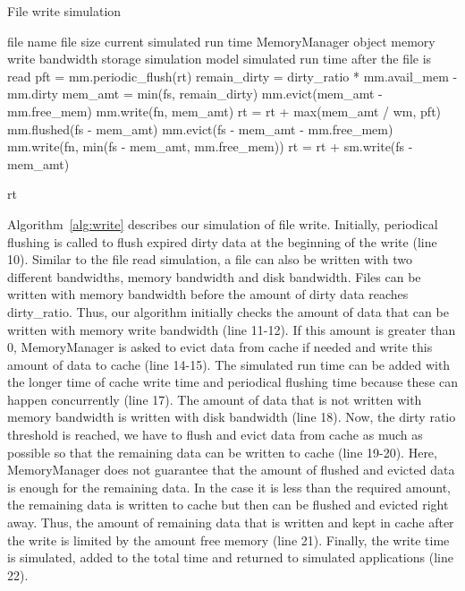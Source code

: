 \documentclass[conference]{IEEEtran}
\newcommand{\Desc}[2]{\State \makebox[2em][l]{#1}#2}
\begin{document}
			\begin{algorithm}\caption{File write simulation}\label{alg:write}
				\small
				\begin{algorithmic}[1]
					\Input
        				\Desc{fn}{file name}
        				\Desc{fs}{file size}
						\Desc{rt}{current simulated run time}
						\Desc{mm}{MemoryManager object}
						\Desc{wm}{memory write bandwidth}
						\Desc{sm}{storage simulation model}
   					\EndInput
   					\Output
						\Desc{rt}{simulated run time after the file is read}
   					\EndOutput
   					\State pft = mm.periodic\_flush(rt)
					\State remain\_dirty = dirty\_ratio * mm.avail\_mem - mm.dirty
					\State mem\_amt = min(fs, remain\_dirty)
					 
    					\State mm.evict(mem\_amt - mm.free\_mem)
    					\State mm.write(fn, mem\_amt)
    				\EndIf
    				\State rt = rt + max(mem\_amt / wm, pft) 
					  
						\State mm.flushed(fs - mem\_amt)  
						\State mm.evict(fs - mem\_amt  - mm.free\_mem) 
						\State mm.write(fn, min(fs - mem\_amt, mm.free\_mem))
						\State rt = rt + sm.write(fs - mem\_amt)
					\EndIf
					
					\Return rt
					
				\end{algorithmic}
			\end{algorithm}

			Algorithm~\ref{alg:write} describes our simulation of file write. 
			Initially, periodical flushing is called to flush expired dirty data 
			at the beginning of the write (line 10).
			Similar to the file read simulation, a file can also be written with 
			two different bandwidths, memory bandwidth and disk bandwidth. 
			Files can be written with memory bandwidth before the amount 
			of dirty data reaches dirty\_ratio. Thus, our algorithm initially checks 
			the amount of data that can be written with memory write 
			bandwidth (line 11-12).
			If this amount is greater than 0, MemoryManager is asked to evict 
			data from cache if needed and write this amount of data to cache 
			(line 14-15).
			The simulated run time can be added with the longer time of cache write 
			time and periodical flushing time because these can happen 
			concurrently (line 17).
			The amount of data that is not written with memory bandwidth is written 
			with disk bandwidth (line 18). 
			Now, the dirty ratio threshold is reached, we have to flush and evict 
			data from cache as much as possible so that 
			the remaining data can be written to cache (line 19-20). 
			Here, MemoryManager does not guarantee that the amount of flushed 
			and evicted data is enough for the remaining data. In the case it is 
			less than the required amount, the remaining data is written to cache 
			but then can be flushed and evicted right away. Thus, the amount 
			of remaining data that is written and kept in cache after the write 
			is limited by the amount free memory (line 21). 
			Finally, the write time is simulated, added to the total time and 
			returned to simulated applications (line 22).
			
\end{document}
